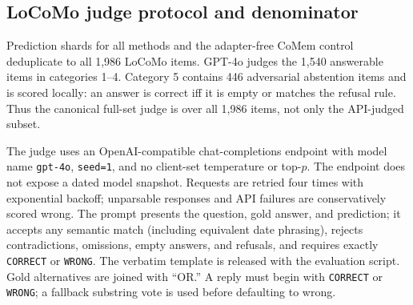 \FloatBarrier
\subsection{LoCoMo judge protocol and denominator}
Prediction shards for all methods and the adapter-free CoMem control deduplicate
to all 1,986 LoCoMo items.
GPT-4o judges the 1,540 answerable items in categories 1--4. Category 5 contains
446 adversarial abstention items and is scored locally: an answer is correct iff
it is empty or matches the refusal rule. Thus the canonical full-set judge is
over all 1,986 items, not only the API-judged subset.

\begin{center}
\small
\captionsetup{hypcap=false}
\setlength{\tabcolsep}{3pt}
\label{tab:locomo-categories}
\end{center}

The judge uses an OpenAI-compatible chat-completions endpoint with model name
\texttt{gpt-4o}, \texttt{seed=1}, and no client-set temperature or top-$p$.
The endpoint does not expose a dated model snapshot. Requests are retried four
times with exponential backoff; unparsable responses and API failures are
conservatively scored wrong. The prompt presents the question, gold answer, and prediction; it accepts any
semantic match (including equivalent date phrasing), rejects contradictions,
omissions, empty answers, and refusals, and requires exactly
\texttt{CORRECT} or \texttt{WRONG}. The verbatim template is released with the
evaluation script.
Gold alternatives are joined with ``OR.'' A reply must begin with
\texttt{CORRECT} or \texttt{WRONG}; a fallback substring vote is used before
defaulting to wrong.

